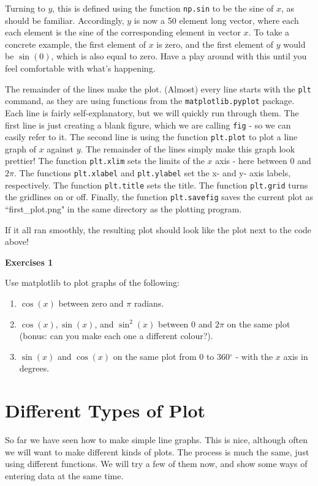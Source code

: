 \documentclass[10pt,a4paper]{memoir}
\begin{document}
Turning to $y$, this is defined using the function \texttt{np.sin} to be the sine of $x$, as should be familiar. Accordingly, $y$ is now a 50 element long vector, where each each element is the sine of the corresponding element in vector $x$. To take a concrete example, the first element of $x$ is zero, and the first element of $y$ would be $\sin (0)$, which is also equal to zero. Have a play around with this until you feel comfortable with what's happening.

The remainder of the lines make the plot. (Almost) every line starts with the \texttt{plt} command, as they are using functions from the \texttt{matplotlib.pyplot} package. Each line is fairly self-explanatory, but we will quickly run through them. The first line is just creating a blank figure, which we are calling \texttt{fig} - so we can easily refer to it. The second line is using the function \texttt{plt.plot} to plot a line graph of $x$ against $y$. The remainder of the lines simply make this graph look prettier! The function \texttt{plt.xlim} sets the limits of the $x$ axis - here between $0$ and $2\pi$. The functions \texttt{plt.xlabel} and \texttt{plt.ylabel} set the x- and y- axis labels, respectively. The function \texttt{plt.title} sets the title. The function \texttt{plt.grid} turns the gridlines on or off. Finally, the function \texttt{plt.savefig} saves the current plot as ``first\_plot.png" in the same directory as the plotting program.  

\noindent If it all ran smoothly, the resulting plot should look like the plot next to the code above!

\noindent \textbf{Exercises 1}

Use matplotlib to plot graphs of the following:

\begin{enumerate}
	\item $\cos(x)$ between zero and $\pi$ radians.
	\item $\cos(x), \sin(x)$, and $\sin^2(x)$ between 0 and $2\pi$ on the same plot (bonus: can you make each one a different colour?).
	\item $\sin(x)$ and $\cos(x)$ on the same plot from 0 to 360$^\circ$ - with the $x$ axis in degrees.
\end{enumerate}
\newpage

\section{Different Types of Plot}
So far we have seen how to make simple line graphs. This is nice, although often we will want to make different kinds of plots. The process is much the same, just using different functions. We will try a few of them now, and show some ways of entering data at the same time.
\end{document}
